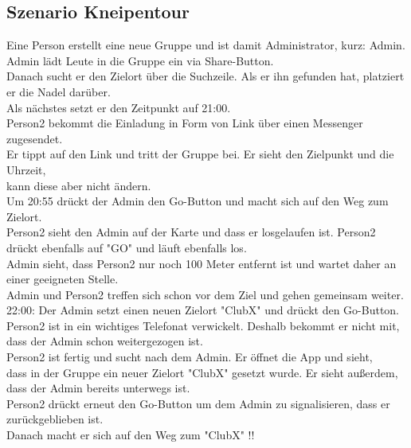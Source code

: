 \subsection{Szenario Kneipentour}
     Eine Person erstellt eine neue Gruppe und ist damit Administrator, kurz: Admin.\\
     Admin lädt Leute in die Gruppe ein via Share-Button. \\
     Danach sucht er den Zielort über die Suchzeile. Als er ihn gefunden hat, platziert er die Nadel darüber.\\
     Als nächstes setzt er den Zeitpunkt auf 21:00.\\
     Person2 bekommt die Einladung in Form von Link über einen Messenger zugesendet.\\
     Er tippt auf den Link und tritt der Gruppe bei. Er sieht den Zielpunkt und die Uhrzeit,\\
     kann diese aber nicht ändern.\\
     Um 20:55 drückt der Admin den Go-Button und macht sich auf den Weg zum Zielort.\\
     Person2 sieht den Admin auf der Karte und dass er losgelaufen ist. Person2 drückt ebenfalls auf "GO" und läuft ebenfalls los.\\
     Admin sieht, dass Person2 nur noch 100 Meter entfernt ist und wartet daher an einer geeigneten Stelle.\\
     Admin und Person2 treffen sich schon vor dem Ziel und gehen gemeinsam weiter.\\
     22:00: Der Admin setzt einen neuen Zielort "ClubX" und drückt den Go-Button.\\
     Person2 ist in ein wichtiges Telefonat verwickelt. Deshalb bekommt er nicht mit,\\
     dass der Admin schon weitergezogen ist.\\
     Person2 ist fertig und sucht nach dem Admin. Er öffnet die App und sieht, \\
     dass in der Gruppe ein neuer Zielort "ClubX" gesetzt wurde. Er sieht außerdem, dass der Admin bereits unterwegs ist.\\
     Person2 drückt erneut den Go-Button um dem Admin zu signalisieren, dass er zurückgeblieben ist.\\
     Danach macht er sich auf den Weg zum "ClubX" !!\\
